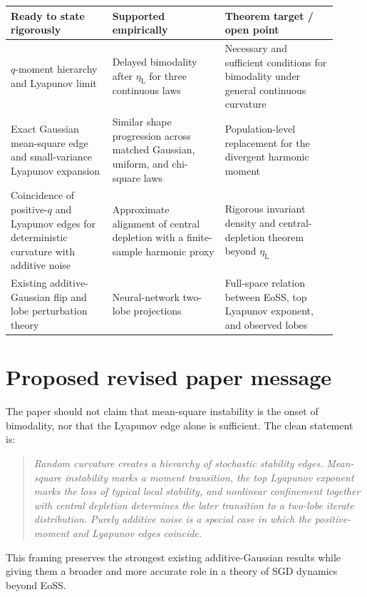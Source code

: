\documentclass[11pt]{article}
\newcommand{\etal}{\eta_{\mathrm L}}
\begin{document}
\begin{center}
\begin{tabular}{>{\raggedright\arraybackslash}p{0.29\linewidth} >{\raggedright\arraybackslash}p{0.31\linewidth} >{\raggedright\arraybackslash}p{0.31\linewidth}}
\toprule
\textbf{Ready to state rigorously} & \textbf{Supported empirically} & \textbf{Theorem target / open point}\\
\midrule
$q$-moment hierarchy and Lyapunov limit & Delayed bimodality after $\etal$ for three continuous laws & Necessary and sufficient conditions for bimodality under general continuous curvature\\[0.35em]
Exact Gaussian mean-square edge and small-variance Lyapunov expansion & Similar shape progression across matched Gaussian, uniform, and chi-square laws & Population-level replacement for the divergent harmonic moment\\[0.35em]
Coincidence of positive-$q$ and Lyapunov edges for deterministic curvature with additive noise & Approximate alignment of central depletion with a finite-sample harmonic proxy & Rigorous invariant density and central-depletion theorem beyond $\etal$\\[0.35em]
Existing additive-Gaussian flip and lobe perturbation theory & Neural-network two-lobe projections & Full-space relation between EoSS, top Lyapunov exponent, and observed lobes\\
\bottomrule
\end{tabular}
\end{center}

\section{Proposed revised paper message}
\enlargethispage{4\baselineskip}

The paper should not claim that mean-square instability is the onset of bimodality, nor that the Lyapunov edge alone is sufficient.  The clean statement is:
\begin{quote}
\emph{Random curvature creates a hierarchy of stochastic stability edges.  Mean-square instability marks a moment transition, the top Lyapunov exponent marks the loss of typical local stability, and nonlinear confinement together with central depletion determines the later transition to a two-lobe iterate distribution.  Purely additive noise is a special case in which the positive-moment and Lyapunov edges coincide.}
\end{quote}
This framing preserves the strongest existing additive-Gaussian results while giving them a broader and more accurate role in a theory of SGD dynamics beyond EoSS.
\end{document}
